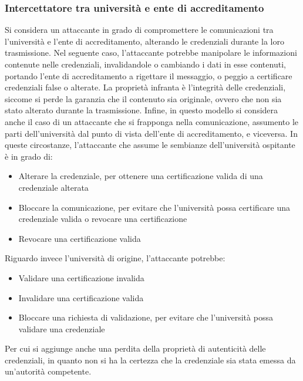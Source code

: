 \documentclass[a4paper,12pt]{article}
\begin{document}
\subsubsection{Intercettatore tra università e ente di accreditamento} Si considera un attaccante in grado di compromettere le comunicazioni tra l'università e l'ente di accreditamento, alterando le credenziali durante la loro trasmissione. Nel seguente caso, l'attaccante potrebbe manipolare le informazioni contenute nelle credenziali, invalidandole o cambiando i dati in esse contenuti, portando l'ente di accreditamento a rigettare il messaggio, o peggio a certificare credenziali false o alterate.
\newline La proprietà infranta è l'integrità delle credenziali, siccome si perde la garanzia che il contenuto sia originale, ovvero che non sia stato alterato durante la trasmissione.
\newline Infine, in questo modello si considera anche il caso di un attaccante che si frapponga nella comunicazione, assumento le parti dell'università dal punto di vista dell'ente di accreditamento, e viceversa. In queste circostanze, l'attaccante che assume le sembianze dell'università ospitante è in grado di:
\begin{itemize}
    \item Alterare la credenziale, per ottenere una certificazione valida di una credenziale alterata
    \item Bloccare la comunicazione, per evitare che l'università possa certificare una credenziale valida o revocare una certificazione
    \item Revocare una certificazione valida
\end{itemize}
Riguardo invece l'università di origine, l'attaccante potrebbe:
\begin{itemize}
    \item Validare una certificazione invalida
    \item Invalidare una certificazione valida
    \item Bloccare una richiesta di validazione, per evitare che l'università possa validare una credenziale
\end{itemize}
Per cui si aggiunge anche una perdita della proprietà di autenticità delle credenziali, in quanto non si ha la certezza che la credenziale sia stata emessa da un'autorità competente.
\end{document}

